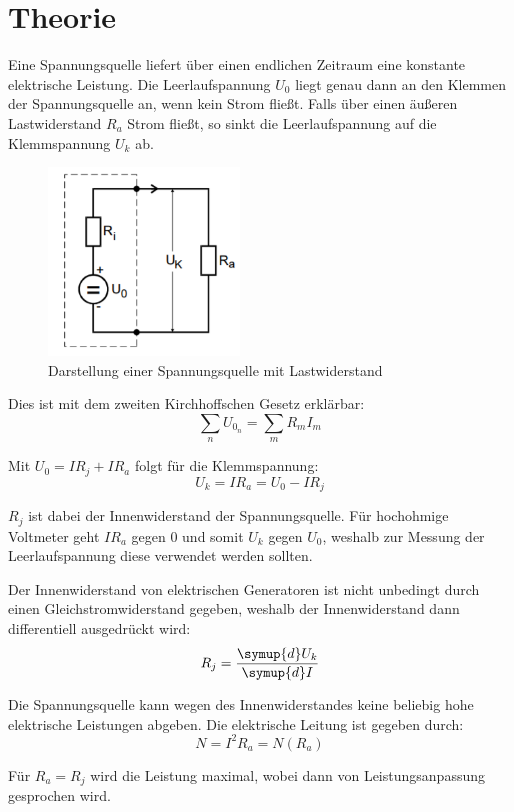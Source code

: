 \section{Theorie}
\label{sec:Theorie}
Eine Spannungsquelle liefert über einen endlichen Zeitraum eine konstante elektrische Leistung.
Die Leerlaufspannung $U_0$ liegt genau dann an den Klemmen der Spannungsquelle an, wenn kein Strom fließt.
Falls über einen äußeren Lastwiderstand $R_a$ Strom fließt, so sinkt die Leerlaufspannung auf
die Klemmspannung $U_k$ ab.

\begin{figure}[H]
  \centering
  \includegraphics[height=5cm]{bild1.PNG}
  \caption{Darstellung einer Spannungsquelle mit Lastwiderstand}
  \label{fig:RLC-Kreis(mit Widerstand)}
\end{figure}


Dies ist mit dem zweiten Kirchhoffschen Gesetz erklärbar:
\begin{equation}
  \sum_{n} U_{0_n} = \sum_{m} R_m I_m
\end{equation}

Mit $U_0 = IR_j + IR_a$ folgt für die Klemmspannung:
\begin{equation}
  U_k = IR_a = U_0 - IR_j
\end{equation}

$R_j$ ist dabei der Innenwiderstand der Spannungsquelle.
Für hochohmige Voltmeter geht $IR_a$ gegen $0$ und somit $U_k$ gegen $U_0$, weshalb zur Messung der Leerlaufspannung
diese verwendet werden sollten.

Der Innenwiderstand von elektrischen Generatoren ist nicht unbedingt durch einen Gleichstromwiderstand gegeben, weshalb
der Innenwiderstand dann differentiell ausgedrückt wird:
\begin{equation}
  R_j = \frac{\symup{d}U_k}{\symup{d}I}
\end{equation}

Die Spannungsquelle kann wegen des Innenwiderstandes keine beliebig hohe elektrische Leistungen
abgeben. Die elektrische Leitung ist gegeben durch:
\begin{equation}
  N = I^2 R_a = N(R_a)
\end{equation}

Für $R_a = R_j$ wird die Leistung maximal, wobei dann von Leistungsanpassung gesprochen wird.
